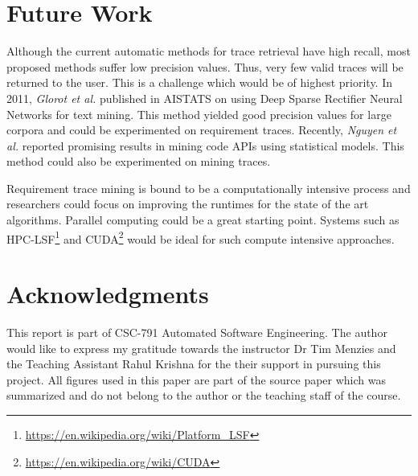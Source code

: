 \documentclass{report}
\begin{document}
\section{Future Work}
\label{sec:future}
Although the current automatic methods for trace retrieval have high recall, most proposed methods suffer low precision values. Thus, very few valid traces will be returned to the user. This is a challenge which would be of highest priority. In 2011, \textit{Glorot et al.} published in AISTATS on using Deep Sparse Rectifier Neural Networks for text mining\cite{glorot11}. This method yielded good precision values for large corpora and could be experimented on requirement traces. Recently, \textit{Nguyen et al.} reported promising results in mining code APIs using statistical models\cite{nguyen14}. This method could also be experimented on mining traces.

Requirement trace mining is bound to be a computationally intensive process and researchers could focus on improving the runtimes for the state of the art algorithms. Parallel computing could be a great starting point. Systems such as HPC-LSF\footnote{\url{https://en.wikipedia.org/wiki/Platform_LSF}} and CUDA\footnote{\url{https://en.wikipedia.org/wiki/CUDA}} would be ideal for such compute intensive approaches.


\section{Acknowledgments}
This report is part of CSC-791 Automated Software Engineering. The author would like to express my gratitude towards the instructor Dr Tim Menzies and the Teaching Assistant Rahul Krishna for the their support in pursuing this project. All figures used in this paper are part of the source paper which was summarized and do not belong to the author or the teaching staff of the course.

%

\end{document}
